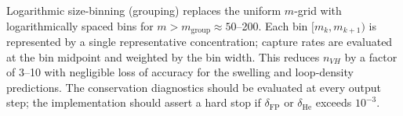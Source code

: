 \documentclass[pdflatex,sn-basic]{sn-jnl} %
\begin{document}
Logarithmic size-binning (grouping) replaces the uniform $m$-grid with
logarithmically spaced bins for $m > m_{\mathrm{group}} \approx 50$--200.
Each bin $[m_k, m_{k+1})$ is represented by a single representative
concentration; capture rates are evaluated at the bin midpoint and
weighted by the bin width. This reduces $n_{VH}$ by a factor of 3--10
with negligible loss of accuracy for the swelling and loop-density
predictions. The conservation diagnostics should be evaluated at every
output step; the implementation should assert a hard stop if
$\delta_{\mathrm{FP}}$ or $\delta_{\mathrm{He}}$ exceeds $10^{-3}$.



\newpage
\bigskip


\end{document}
